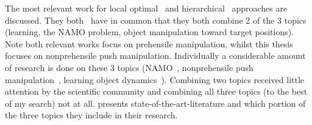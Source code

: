 The most relevant work for local optimal~\cite{sabbaghnovin_model_2021} and hierarchical~\cite{scholz_navigation_2016} approaches are discussed. They both~\cite{sabbaghnovin_model_2021,scholz_navigation_2016} have in common that they both combine 2 of the 3 topics (learning, the \ac{NAMO} problem, object manipulation toward target positions). Note both relevant works focus on prehensile manipulation, whilst this thesis focuses on nonprehensile push manipulation. Individually a considerable amount of research is done on these 3 topics (\ac{NAMO}~\cite{chen_fast_2018,elbanhawi_samplingbased_2014,ellis_navigation_2022,kingston_samplingbased_2018,lavalle_planning_2006,wang_affordancebased_2020}, nonprehensile push manipulation~\cite{arruda_uncertainty_2017,bauza_dataefficient_2018,mericli_pushmanipulation_2015,stuber_featurebased_2018,stuber_let_2020,toussaint_sequenceofconstraints_2022}, learning object dynamics~\cite{cong_selfadapting_2020,seegmiller_vehicle_2013}). Combining two topics received little attention by the scientific community and combining all three topics (to the best of my search) not at all.  presents state-of-the-art-literature and which portion of the three topics they include in their research.\bs

